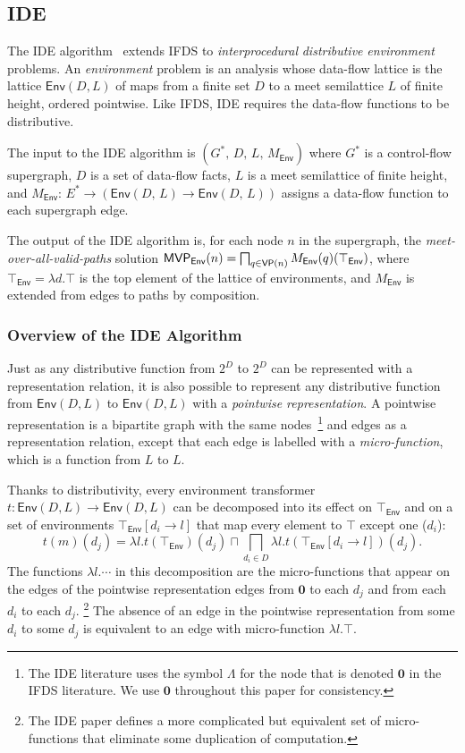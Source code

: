 \subsection{IDE}\label{sec:bgide}

The IDE algorithm~\cite{sagiv1996precise} extends IFDS to
\textit{interprocedural} \textit{distributive} \textit{environment}
problems. An \textit{environment} problem is an analysis whose data-flow
lattice is the lattice $\textsf{Env}(D,L)$ of maps from a finite set $D$ to a meet semilattice
$L$ of finite height, ordered pointwise. Like IFDS, IDE requires the data-flow functions to be distributive.

The input to the IDE algorithm is
  $(G^*,\,D,\,L,\,M_\textsf{Env})$
where $G^*$ is a control-flow supergraph,
$D$ is a set of data-flow facts,
$L$ is a meet semilattice of finite height,
and $M_\textsf{Env}:\,E^*\to(\textsf{Env}(D,\,L)\to \textsf{Env}(D,\,L))$ assigns a data-flow function
to each supergraph edge.

The output of the IDE algorithm is, for each node $n$ in the supergraph,
the \textit{meet-over-all-valid-paths} solution
$\textsf{MVP}_{\textsf{Env}}(n)=\bigsqcap_{q\in\textsf{VP}(n)}M_\textsf{Env}(q)(\top_\textsf{Env})$,
where $\top_\textsf{Env} = \lambda d.\top$ is the top element of the lattice of environments,
and $M_\textsf{Env}$ is extended from edges to paths by composition.

\subsubsection{Overview of the IDE Algorithm}\label{sec:ideoverview}
Just as any distributive function from $2^D$ to $2^D$ can be represented with a
representation relation, it is also possible to represent any distributive function from
$\textsf{Env}(D,L)$
to
$\textsf{Env}(D,L)$
with a \textit{pointwise representation}. A pointwise representation is a bipartite graph
with the same nodes~\footnote{The IDE literature uses the symbol $\Lambda$ for the node that
    is denoted $\mathbf0$ in the IFDS literature. We use $\mathbf0$ throughout this paper for consistency.}
and edges as a representation relation, except that each edge is labelled
with a \textit{micro-function}, which is a function from $L$ to $L$. 

Thanks to distributivity, every environment transformer 
$t : \textsf{Env}(D,L) \to \textsf{Env}(D,L)$
can be decomposed into its effect on $\top_{\textsf{Env}}$ and on a set of environments $\top_{\textsf{Env}}[d_i\to l]$
that map every element to $\top$ except one ($d_i$):
\[
    t(m)(d_j) = \lambda l. t(\top_{\textsf{Env}})(d_j) \sqcap \bigsqcap_{d_i\in D} \lambda l. t(\top_{\textsf{Env}}[d_i\to l])(d_j).
\]
The functions $\lambda l. \cdots$ in this decomposition are the micro-functions that
appear on the edges of the pointwise representation edges from $\mathbf0$ to each $d_j$ and from
each $d_i$ to each $d_j$.%
\footnote{The IDE paper defines a more complicated but equivalent set of micro-functions
that eliminate some duplication of computation.}
The absence of an edge in the pointwise representation from some $d_i$ to some $d_j$ is
equivalent to an edge with micro-function $\lambda l.\top$.

